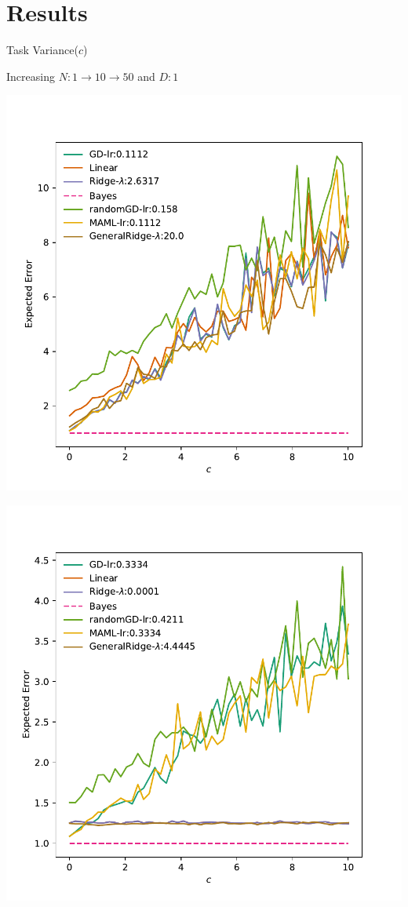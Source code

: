 \documentclass[aspectratio=169]{beamer}
\begin{document}
\section{Results}
\begin{frame}{Task Variance($c$)}
{
\centering
  \color{Pink} Increasing $N:1\to 10 \to 50$ and $D:1$
  \begin{minipage}{0.33\textwidth}
    \includegraphics[width=\textwidth]{Figures/c-1-1-x-0.pdf}
  \end{minipage}%
  \begin{minipage}{0.33\textwidth}
    \includegraphics[width=\textwidth]{Figures/c-1-10-x-0.pdf}

\end{minipage}}
\end{frame}
\end{document}

